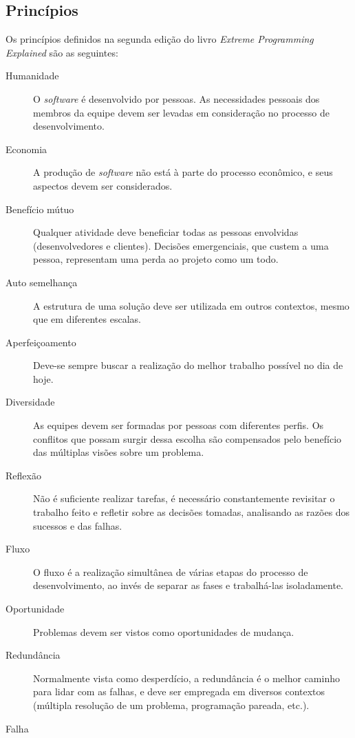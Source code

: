   \subsection{Princípios}

    Os princípios definidos na segunda edição do livro \textit{Extreme Programming Explained} \cite{beck04} são as seguintes:

    \begin{description}
      \item[Humanidade]
	      O \textit{software} é desenvolvido por pessoas. As necessidades pessoais dos membros da equipe devem ser levadas em consideração no processo de desenvolvimento.
      \item[Economia]
        A produção de \textit{software} não está à parte do processo econômico, e seus aspectos devem ser considerados.
      \item[Benefício mútuo]
        Qualquer atividade deve beneficiar todas as pessoas envolvidas (desenvolvedores e clientes). Decisões emergenciais, que custem a uma pessoa, representam uma perda ao projeto como um todo.
      \item[Auto semelhança]
        A estrutura de uma solução deve ser utilizada em outros contextos, mesmo que em diferentes escalas.
      \item[Aperfeiçoamento]
        Deve-se sempre buscar a realização do melhor trabalho possível no dia de hoje.
      \item[Diversidade]
        As equipes devem ser formadas por pessoas com diferentes perfis. Os conflitos que possam surgir dessa escolha são compensados pelo benefício das múltiplas visões sobre um problema.
      \item[Reflexão]
        Não é suficiente realizar tarefas, é necessário constantemente revisitar o trabalho feito e refletir sobre as decisões tomadas, analisando as razões dos sucessos e das falhas.
      \item[Fluxo]
        O fluxo é a realização simultânea de várias etapas do processo de desenvolvimento, ao invés de separar as fases e trabalhá-las isoladamente.
      \item[Oportunidade]
        Problemas devem ser vistos como oportunidades de mudança.
      \item[Redundância]
        Normalmente vista como desperdício, a redundância é o melhor caminho para lidar com as falhas, e deve ser empregada em diversos contextos (múltipla resolução de um problema, programação pareada, etc.).
      \item[Falha]

\end{description}

